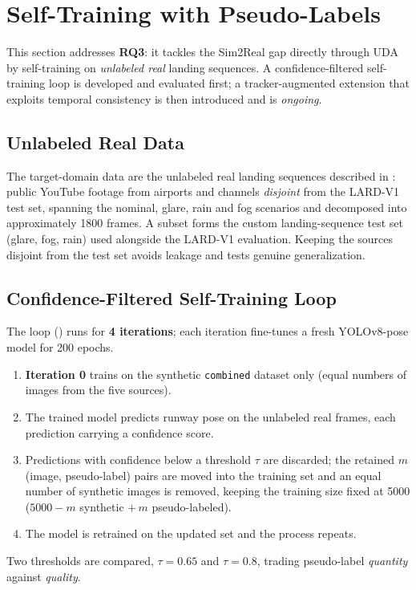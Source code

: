 \section{Self-Training with Pseudo-Labels}
\label{sec:pseudo-labels}

This section addresses \textbf{RQ3}: it tackles the Sim2Real gap directly through
\ac{UDA} by self-training on \emph{unlabeled real} landing sequences. A
confidence-filtered self-training loop is developed and evaluated first; a
tracker-augmented extension that exploits temporal consistency is then introduced and
is \emph{ongoing}.

\subsection{Unlabeled Real Data}
\label{subsec:pl-data}
The target-domain data are the unlabeled real landing sequences described in
: public YouTube footage from airports and channels
\emph{disjoint} from the LARD-V1 test set, spanning the nominal, glare, rain and fog
scenarios and decomposed into approximately 1800 frames. A subset forms the custom
landing-sequence test set (glare, fog, rain) used alongside the LARD-V1 evaluation.
Keeping the sources disjoint from the test set avoids leakage and tests genuine
generalization.

\subsection{Confidence-Filtered Self-Training Loop}
\label{subsec:pl-selftraining}
The loop () runs for \textbf{4 iterations}; each iteration
fine-tunes a fresh YOLOv8-pose model for 200 epochs.
\begin{enumerate}
    \item \textbf{Iteration 0} trains on the synthetic \texttt{combined} dataset only
    (equal numbers of images from the five sources).
    \item The trained model predicts runway pose on the unlabeled real frames, each
    prediction carrying a confidence score.
    \item Predictions with confidence below a threshold $\tau$ are discarded; the
    retained $m$ (image, pseudo-label) pairs are moved into the training set and an
    equal number of synthetic images is removed, keeping the training size fixed at
    5000 ($5000-m$ synthetic $+\,m$ pseudo-labeled).
    \item The model is retrained on the updated set and the process repeats.
\end{enumerate}
Two thresholds are compared, \textbf{$\tau=0.65$} and \textbf{$\tau=0.8$}, trading
pseudo-label \emph{quantity} against \emph{quality}.

